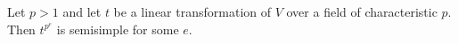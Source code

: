 Let $p > 1$ and let $t$ be a linear transformation of $V$ over a field of characteristic $p$. Then $t^{p^e}$ is semisimple for some $e$.

